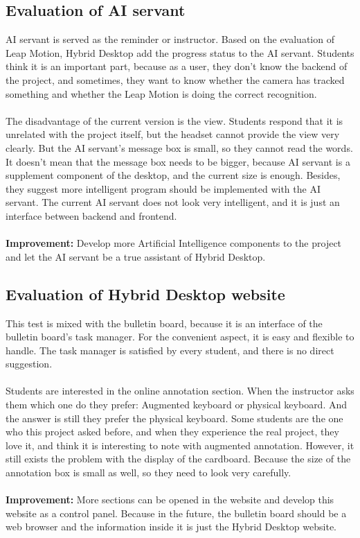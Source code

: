 \subsection{Evaluation of AI servant}
AI servant is served as the reminder or instructor. Based on the evaluation of Leap Motion, Hybrid Desktop add the progress status to the AI servant. Students think it is an important part, because as a user, they don’t know the backend of the project, and sometimes, they want to know whether the camera has tracked something and whether the Leap Motion is doing the correct recognition.
\\
\\
The disadvantage of the current version is the view. Students respond that it is unrelated with the project itself, but the headset cannot provide the view very clearly. But the AI servant’s message box is small, so they cannot read the words. It doesn’t mean that the message box needs to be bigger, because AI servant is a supplement component of the desktop, and the current size is enough. Besides, they suggest more intelligent program should be implemented with the AI servant. The current AI servant does not look very intelligent, and it is just an interface between backend and frontend.
\\
\\
\textbf{Improvement:} Develop more Artificial Intelligence components to the project and let the AI servant be a true assistant of Hybrid Desktop.


\subsection{Evaluation of Hybrid Desktop website}
This test is mixed with the bulletin board, because it is an interface of the bulletin board’s task manager. For the convenient aspect, it is easy and flexible to handle. The task manager is satisfied by every student, and there is no direct suggestion.
\\
\\ 
Students are interested in the online annotation section. When the instructor asks them which one do they prefer: Augmented keyboard or physical keyboard. And the answer is still they prefer the physical keyboard. Some students are the one who this project asked before, and when they experience the real project, they love it, and think it is interesting to note with augmented annotation. However, it still exists the problem with the display of the cardboard. Because the size of the annotation box is small as well, so they need to look very carefully.
\\
\\
\textbf{Improvement:} More sections can be opened in the website and develop this website as a control panel. Because in the future, the bulletin board should be a web browser and the information inside it is just the Hybrid Desktop website.


